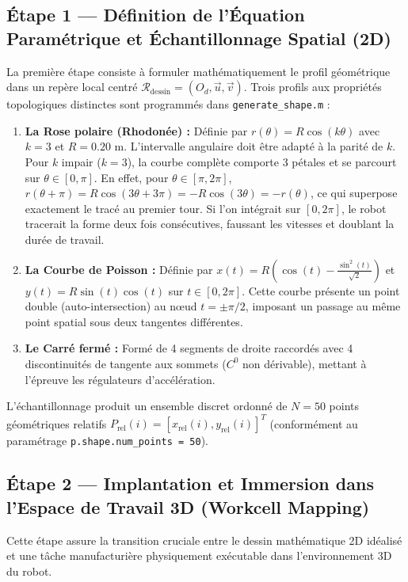 \documentclass[11pt,a4paper]{report}
\begin{document}
\subsection{Étape 1 — Définition de l'Équation Paramétrique et Échantillonnage Spatial (2D)}
La première étape consiste à formuler mathématiquement le profil géométrique dans un repère local centré $\mathcal{R}_{\text{dessin}} = (O_d, \vec{u}, \vec{v})$. Trois profils aux propriétés topologiques distinctes sont programmés dans \texttt{generate\_shape.m} :
\begin{enumerate}
    \item \textbf{La Rose polaire (Rhodonée) :} Définie par $r(\theta) = R \cos(k\theta)$ avec $k=3$ et $R=0.20\text{ m}$. L'intervalle angulaire doit être adapté à la parité de $k$. Pour $k$ impair ($k=3$), la courbe complète comporte 3 pétales et se parcourt sur $\theta \in [0, \pi]$. En effet, pour $\theta \in [\pi, 2\pi]$, $r(\theta + \pi) = R\cos(3\theta + 3\pi) = -R\cos(3\theta) = -r(\theta)$, ce qui superpose exactement le tracé au premier tour. Si l'on intégrait sur $[0, 2\pi]$, le robot tracerait la forme deux fois consécutives, faussant les vitesses et doublant la durée de travail.
    \item \textbf{La Courbe de Poisson :} Définie par $x(t) = R\left(\cos(t) - \frac{\sin^2(t)}{\sqrt{2}}\right)$ et $y(t) = R\sin(t)\cos(t)$ sur $t \in [0, 2\pi]$. Cette courbe présente un point double (auto-intersection) au nœud $t = \pm \pi/2$, imposant un passage au même point spatial sous deux tangentes différentes.
    \item \textbf{Le Carré fermé :} Formé de 4 segments de droite raccordés avec 4 discontinuités de tangente aux sommets ($C^0$ non dérivable), mettant à l'épreuve les régulateurs d'accélération.
\end{enumerate}
L'échantillonnage produit un ensemble discret ordonné de $N = 50$ points géométriques relatifs $P_{\text{rel}}(i) = [x_{\text{rel}}(i), y_{\text{rel}}(i)]^T$ (conformément au paramétrage \texttt{p.shape.num\_points = 50}).

\subsection{Étape 2 — Implantation et Immersion dans l'Espace de Travail 3D (Workcell Mapping)}
Cette étape assure la transition cruciale entre le dessin mathématique 2D idéalisé et une tâche manufacturière physiquement exécutable dans l'environnement 3D du robot.
\end{document}
